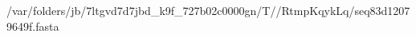 \documentclass[10pt]{article}
\begin{document}
\begin{texshade}{/var/folders/jb/7ltgvd7d7jbd_k9f_727b02c0000gn/T//RtmpKqykLq/seq83d12079649f.fasta}
\hideconsensus
{}
\hidelogoscale
{}
\showlegend
\end{texshade}
\end{document}
